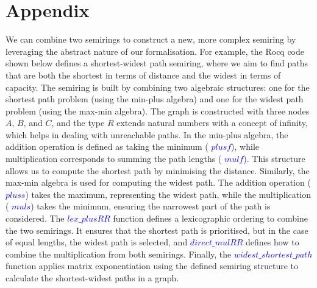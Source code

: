 \documentclass[a4paper,UKenglish,cleveref, autoref, thm-restate, anonymous]{lipics-v2021}
\begin{document}
\section{Appendix}\label{appendix}
We can combine two semirings to construct a new, more complex semiring by leveraging the abstract nature of our formalisation. For example, the Rocq code shown below defines a shortest-widest path semiring, where we aim to find paths that are both the shortest in terms of distance and the widest in terms of capacity. The semiring is built by combining two algebraic structures: one for the shortest path problem (using the min-plus algebra) and one for the widest path problem (using the max-min algebra).  The graph is constructed with three nodes $A$, $B$, and $C$, and 
the type $R$ extends natural numbers with a concept of infinity, which helps in dealing with unreachable paths.  In the min-plus algebra, the addition operation is defined as taking the minimum ( \textcolor{blue}{$plusf$}), while multiplication corresponds to summing the path lengths ( \textcolor{blue}{$mulf$}). This structure allows us to compute the shortest path by minimising the distance.
Similarly, the max-min algebra is used for computing the widest path. The addition operation ( \textcolor{blue}{$pluss$}) takes the maximum, representing the widest path, while the multiplication ( \textcolor{blue}{$muls$}) takes the minimum, ensuring the narrowest part of the path is considered. The \textcolor{blue}{$lex\_plusRR$} function defines a lexicographic ordering to combine the two semirings. It ensures that the shortest path is prioritised, but in the case of equal lengths, the widest path is selected, and  \textcolor{blue}{$direct\_mulRR$} defines how to combine the multiplication from both semirings. Finally, the  \textcolor{blue}{$widest\_shortest\_path$} function applies matrix exponentiation using the defined semiring structure to calculate the shortest-widest paths in a graph.
\end{document}
